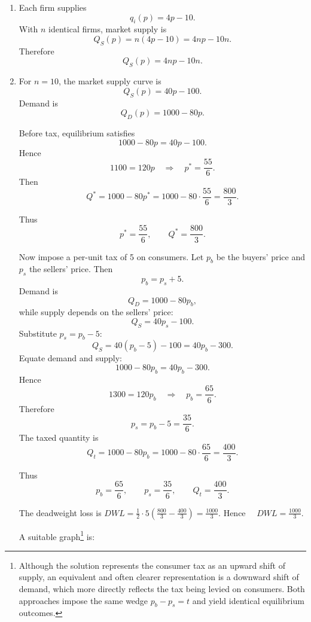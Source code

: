 \documentclass[12pt]{article}
\begin{document}
\begin{enumerate}[label=(\alph*)]
    \item
    Each firm supplies
    \[
    q_i(p)=4p-10.
    \]
    With \(n\) identical firms, market supply is
    \[
    Q_S(p)=n(4p-10)=4np-10n.
    \]
    Therefore
    \[
    \boxed{Q_S(p)=4np-10n.}
    \]

    \item
    For \(n=10\), the market supply curve is
    \[
    Q_S(p)=40p-100.
    \]
    Demand is
    \[
    Q_D(p)=1000-80p.
    \]

    Before tax, equilibrium satisfies
    \[
    1000-80p=40p-100.
    \]
    Hence
    \[
    1100=120p
    \quad\Longrightarrow\quad
    p^*=\frac{55}{6}.
    \]
    Then
    \[
    Q^*=1000-80p^*
    =1000-80\cdot \frac{55}{6}
    =\frac{800}{3}.
    \]

    Thus
    \[
    \boxed{p^*=\frac{55}{6},\qquad Q^*=\frac{800}{3}.}
    \]

    Now impose a per-unit tax of 5 on consumers. Let \(p_b\) be the buyers' price and \(p_s\) the sellers' price. Then
    \[
    p_b=p_s+5.
    \]
    Demand is
    \[
    Q_D=1000-80p_b,
    \]
    while supply depends on the sellers' price:
    \[
    Q_S=40p_s-100.
    \]
    Substitute \(p_s=p_b-5\):
    \[
    Q_S=40(p_b-5)-100=40p_b-300.
    \]
    Equate demand and supply:
    \[
    1000-80p_b=40p_b-300.
    \]
    Hence
    \[
    1300=120p_b
    \quad\Longrightarrow\quad
    p_b=\frac{65}{6}.
    \]
    Therefore
    \[
    p_s=p_b-5=\frac{35}{6}.
    \]
    The taxed quantity is
    \[
    Q_t=1000-80p_b
    =1000-80\cdot \frac{65}{6}
    =\frac{400}{3}.
    \]

    Thus
    \[
    \boxed{p_b=\frac{65}{6},\qquad p_s=\frac{35}{6},\qquad Q_t=\frac{400}{3}.}
    \]

    The deadweight loss is
    \(
    DWL=\frac12\cdot 5\left(\frac{800}{3}-\frac{400}{3}\right)=\frac{1000}{3}.
    \)
    Hence $\quad \boxed{DWL=\frac{1000}{3}.}$

    A suitable graph\footnote{Although the solution represents the consumer tax as an upward shift of supply, an equivalent and often clearer representation is a downward shift of demand, which more directly reflects the tax being levied on consumers. Both approaches impose the same wedge \(p_b - p_s = t\) and yield identical equilibrium outcomes.} is:

    \begin{center}
\end{center}
\end{enumerate}
\end{document}
